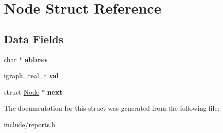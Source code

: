 \hypertarget{struct_node}{}\section{Node Struct Reference}
\label{struct_node}
\subsection*{Data Fields}
\begin{DoxyCompactItemize}
\item 
\mbox{\label{struct_node_a178c16b0a92c53ed7c1f4722db90a876}} 
char $\ast$ {\bfseries abbrev}
\item 
\mbox{\label{struct_node_ab4a7695864395a8fc4ee1182952ed4f4}} 
igraph\+\_\+real\+\_\+t {\bfseries val}
\item 
\mbox{\label{struct_node_aa162dd1e0693188a22b1f13b9a2a0ef0}} 
struct \mbox{\hyperlink{struct_node}{Node}} $\ast$ {\bfseries next}
\end{DoxyCompactItemize}


The documentation for this struct was generated from the following file\+:\begin{DoxyCompactItemize}
\item 
include/reports.\+h\end{DoxyCompactItemize}
